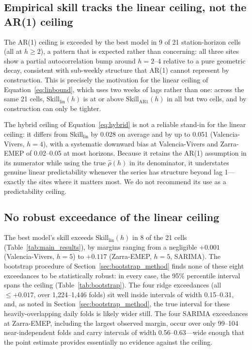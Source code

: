 \documentclass{article}
\begin{document}
\subsection{Empirical skill tracks the linear ceiling, not the AR(1) ceiling}

The AR(1) ceiling is exceeded by the best model in 9 of 21 station-horizon
cells (all at $h\ge2$), a pattern that is expected rather than concerning: all
three sites show a partial autocorrelation bump around $h=2$--$4$ relative to
a pure geometric decay, consistent with sub-weekly structure that AR(1) cannot
represent by construction.
This is precisely the motivation for the linear ceiling of
Equation~\ref{eq:linbound}, which uses two weeks of lags rather than one:
across the same 21 cells, $\mathrm{Skill}_{\mathrm{lin}}(h)$ is at or above
$\mathrm{Skill}_{\mathrm{AR1}}(h)$ in all but two cells, and by construction
can only be tighter.

The hybrid ceiling of Equation~\ref{eq:hybrid} is not a reliable stand-in for
the linear ceiling: it differs from $\mathrm{Skill}_{\mathrm{lin}}$ by
0.028 on average and by up to 0.051 (Valencia-Vivers, $h=4$), with a
systematic downward bias at Valencia-Vivers and Zarra-EMEP of 0.02--0.05 at
most horizons.
Because it retains the AR(1) assumption in its numerator while using the true
$\hat\rho(h)$ in its denominator, it understates genuine linear predictability
whenever the series has structure beyond lag 1---exactly the sites where it
matters most.
We do not recommend its use as a predictability ceiling.

\subsection{No robust exceedance of the linear ceiling}

The best model's skill exceeds $\mathrm{Skill}_{\mathrm{lin}}(h)$ in 8 of the
21 cells (Table~\ref{tab:main_results}), by margins ranging from a negligible
$+0.001$ (Valencia-Vivers, $h=5$) to $+0.117$ (Zarra-EMEP, $h=5$, SARIMA).
The bootstrap procedure of Section~\ref{sec:bootstrap_method} finds none of
these eight exceedances to be statistically robust: in every case, the 95\%
percentile interval spans the ceiling (Table~\ref{tab:bootstrap}).
The four ridge exceedances (all $\le+0.017$, over 1{,}224--1{,}446 folds) sit
well inside intervals of width 0.15--0.31, and, as noted in
Section~\ref{sec:bootstrap_method}, the true interval for these
heavily-overlapping daily folds is likely wider still.
The four SARIMA exceedances at Zarra-EMEP, including the largest observed
margin, occur over only 99--104 near-independent folds and carry intervals of
width 0.56--0.63---wide enough that the point estimate provides essentially no
evidence against the ceiling.
\end{document}
